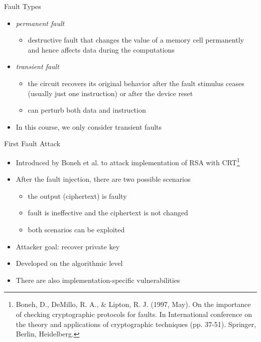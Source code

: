 \begin{frame}{Fault Types}
    \begin{itemize}
        \item \textit{permanent fault} 
        \begin{itemize}
            \item destructive fault that changes the value of a memory cell permanently and hence affects data during the computations
        \end{itemize}
        \item \textit{transient fault}
        \begin{itemize}
            \item the circuit recovers its original behavior after the fault stimulus ceases (usually just one instruction) or after the device reset
            \item can perturb both data and instruction
        \end{itemize}
        \item In this course, we only consider transient faults
    \end{itemize}
\end{frame}

\begin{frame}{First Fault Attack}
    \begin{itemize}
         \item Introduced by Boneh et al. to attack implementation of RSA with CRT\footnote{Boneh, D., DeMillo, R. A., \& Lipton, R. J. (1997, May). On the importance of checking cryptographic protocols for faults. In International conference on the theory and applications of cryptographic techniques (pp. 37-51). Springer, Berlin, Heidelberg.}
        \item After the fault injection, there are two possible scenarios
        \begin{itemize}
            \item the output (ciphertext) is faulty
            \item fault is ineffective and the ciphertext is not changed
            \item both scenarios can be exploited
        \end{itemize}
        \item Attacker goal: recover private key
        \item Developed on the algorithmic level
        \item There are also implementation-specific vulnerabilities
    \end{itemize}
\end{frame}

